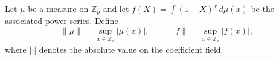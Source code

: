 Let $\mu$ be a measure on $\mathbb{Z}_p$ and let $f(X) = \int (1+X)^x \, d\mu(x)$ be the associated power series. Define
$$
\|\mu\| = \sup_{x \in \mathbb{Z}_p} |\mu(x)|, \qquad
\|f\| = \sup_{x \in \mathbb{Z}_p} |f(x)|,
$$
where $|\cdot|$ denotes the absolute value on the coefficient field.
